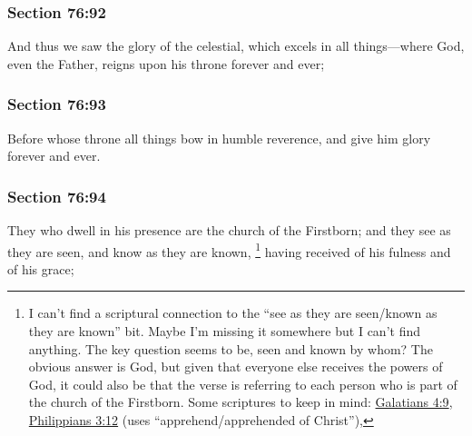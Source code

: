 	\subsubsection{Section 76:92} %
		\label{DC76-92}

		And thus we saw the glory of the celestial, which excels in all things---where God, even the Father, reigns upon his throne forever and ever;


	\subsubsection{Section 76:93} %
		\label{DC76-93}

		Before whose throne all things bow in humble reverence, and give him glory forever and ever.


	\subsubsection{Section 76:94} %
		\label{DC76-94}

		They who dwell in his presence are the church of the Firstborn; and they see as they are seen, and know as they are known,%
			\footnote{%
				I can't find a scriptural connection to the ``see as they are seen/known as they are known'' bit. Maybe I'm missing it somewhere but I can't find anything. The key question seems to be, seen and known by whom? The obvious answer is God, but given that everyone else receives the powers of God, it could also be that the verse is referring to each person who is part of the church of the Firstborn. Some scriptures to keep in mind: \hyperref[GALATIANS-4-9]{Galatians 4:9}, \hyperref[PHILIPPIANS-3-12]{Philippians 3:12} (uses ``apprehend/apprehended of Christ''), 
				}
		having received of his fulness and of his grace;

